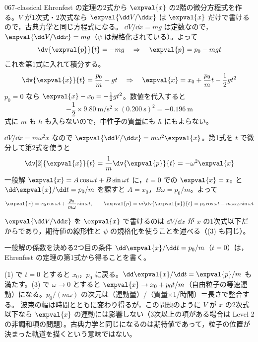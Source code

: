 \documentclass[uplatex,dvipdfmx,a4paper,11pt]{jsarticle}
\begin{document}
\begin{kaisetsu}{067-classical}
\houshin Ehrenfest の定理の2式から $\expval{x}$ の2階の微分方程式を作る。$V$ が1次式・2次式なら $\expval{\dd V/\dd x}$ は $\expval{x}$ だけで書けるので，古典力学と同じ方程式になる。
\keisan {} $\dd V/\dd x=mg$ は定数なので，$\expval{\dd V/\dd x}=mg$（$\psi$ は規格化されている）。よって
\[ \dv{\expval{p}}{t}=-mg\quad\Rightarrow\quad \expval{p}=p_{0}-mgt \]
これを第1式に入れて積分する。
\[ \dv{\expval{x}}{t}=\frac{p_{0}}{m}-gt\quad\Rightarrow\quad \expval{x}=x_{0}+\frac{p_{0}}{m}t-\frac{1}{2}gt^{2} \]
 $p_{0}=0$ なら $\expval{x}-x_{0}=-\frac{1}{2}gt^{2}$。数値を代入すると
\[ -\frac{1}{2}\times\qty{9.80}{\metre\per\second\squared}\times(\qty{0.200}{\second})^{2}=-\qty{0.196}{\metre} \]
式に $m$ も $\hbar$ も入らないので，中性子の質量にも $\hbar$ にもよらない。

 $\dd V/\dd x=m\omega^{2}x$ なので $\expval{\dd V/\dd x}=m\omega^{2}\expval{x}$。第1式を $t$ で微分して第2式を使うと
\[ \dv[2]{\expval{x}}{t}=\frac{1}{m}\dv{\expval{p}}{t}=-\omega^{2}\expval{x} \]
一般解 $\expval{x}=A\cos\omega t+B\sin\omega t$ に，$t=0$ での $\expval{x}=x_{0}$ と $\dd\expval{x}/\dd t=p_{0}/m$ を課すと $A=x_{0}$，$B\omega=p_{0}/m$。よって
\[ \expval{x}=x_{0}\cos\omega t+\frac{p_{0}}{m\omega}\sin\omega t,\qquad \expval{p}=m\dv{\expval{x}}{t}=p_{0}\cos\omega t-m\omega x_{0}\sin\omega t \]
\begin{ronten}
  \item {} $\expval{\dd V/\dd x}$ を $\expval{x}$ で書けるのは $\dd V/\dd x$ が $x$ の1次式以下だからであり，期待値の線形性と $\psi$ の規格化を使うことを述べる（(3) も同じ）。
  \item {} 一般解の係数を決める2つ目の条件 $\dd\expval{x}/\dd t=p_{0}/m$（$t=0$）は，Ehrenfest の定理の第1式から得ることを書く。
\end{ronten}
\kenzan (1) で $t=0$ とすると $x_{0}$，$p_{0}$ に戻る。$\dd\expval{x}/\dd t=\expval{p}/m$ も満たす。(3) で $\omega\to0$ とすると $\expval{x}\to x_{0}+p_{0}t/m$（自由粒子の等速運動）になる。$p_{0}/(m\omega)$ の次元は（運動量）/（質量$\times$1/時間）＝長さで整合する。
\tsumazuki 波束の幅は時間とともに変わり得るが，この問題のように $V$ が $x$ の2次式以下なら $\expval{x}$ の運動には影響しない（3次以上の項がある場合は Level 2 の非調和項の問題）。古典力学と同じになるのは期待値であって，粒子の位置が決まった軌道を描くという意味ではない。
\end{kaisetsu}
\end{document}
